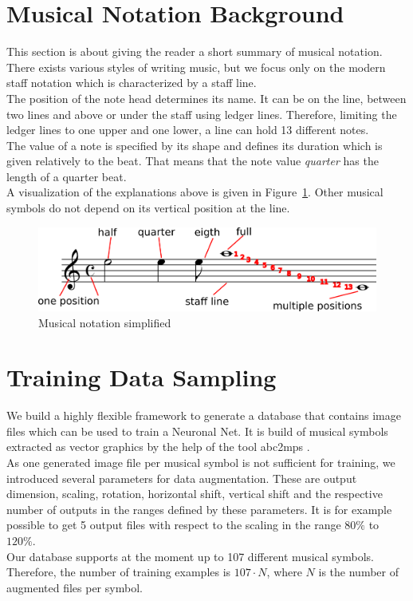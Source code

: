 \documentclass[twocolumn]{article}
\begin{document}
\section{Musical Notation Background}
This section is about giving the reader a short summary of musical notation.\\
There exists various styles of writing music, but we focus only on the modern staff notation which is characterized by a staff line. \\
The position of the note head determines its name. It can be on the line, between two lines and above or under the staff using ledger lines. Therefore, limiting the ledger lines to one upper and one lower, a line can hold 13 different notes. \\
The value of a note is specified by its shape and defines its duration which is given relatively to the beat. That means that the note value \textit{quarter} has the length of a quarter beat. \\
A visualization of the explanations above is given in Figure~\ref{musical_notation}. 
Other musical symbols do not depend on its vertical position at the line. 


\begin{figure}
 \includegraphics[width=\linewidth]{notation.png}
 \caption{Musical notation simplified}
 \label{musical_notation}
\end{figure}

\section{Training Data Sampling}
We build a highly flexible framework to generate a database that contains image files which can be used to train a Neuronal Net. It is build of musical symbols extracted as vector graphics by the help of the tool abc2mps \citet{abc2mps}. \\
As one generated image file per musical symbol is not sufficient for training, we introduced several parameters for data augmentation. These are output dimension, scaling, rotation, horizontal shift, vertical shift and the respective number of outputs in the ranges defined by these parameters. It is for example possible to get 5 output files with respect to the scaling in the range $80\%$ to $120\%$. \\
Our database supports at the moment up to 107 different musical symbols. Therefore, the number of training examples is $107 \cdot N$, where $N$ is the number of augmented files per symbol. 
\end{document}
